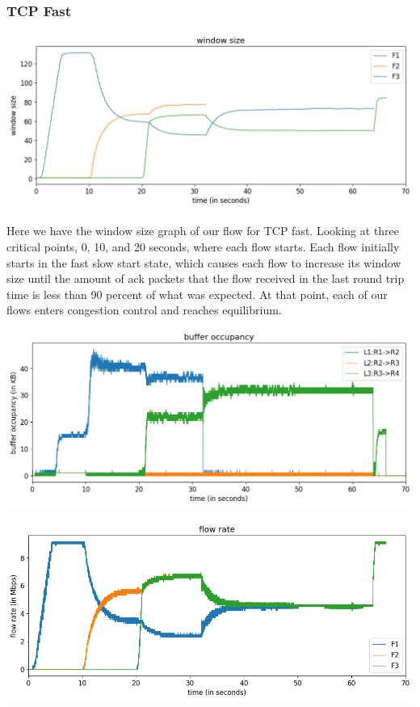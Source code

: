 \documentclass{article}
\begin{document}
\subsubsection{TCP Fast}

\includegraphics[width = \textwidth]{"test_case2_fast window size"}

Here we have the window size graph of our flow for TCP fast. Looking at three critical points, 0, 10, and 20 seconds, where each flow starts. Each flow initially starts in the fast slow start state, which causes each flow to increase its window size until the amount of ack packets that the flow received in the last round trip time is less than 90 percent of what was expected. At that point, each of our flows enters congestion control and reaches equilibrium. 

\includegraphics[width = \textwidth]{"test_case2_fast buffer occupancy"}

\includegraphics[width = \textwidth]{"test_case2_fast flow rate"}
\end{document}
